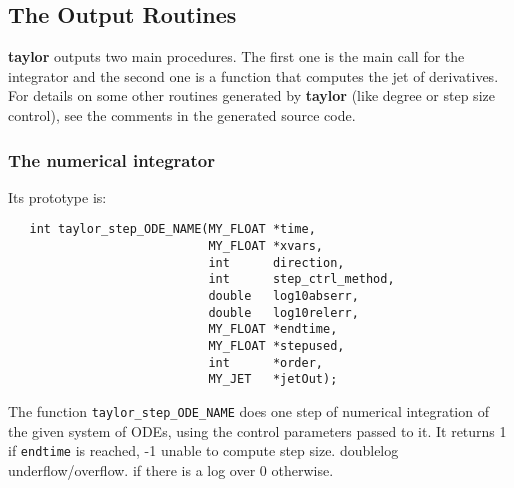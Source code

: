 \documentclass[10pt]{article}
\theoremstyle{remark}
\newcommand{\taylorname}{{\bf taylor}}
\begin{document}
\subsection{The Output Routines}\label{sec:or}
\taylorname{} outputs two main procedures. The first one is the main
call for the integrator and the second one is a function that computes
the jet of derivatives. For details on some other routines generated
by \taylorname{} (like degree or step size control), see the comments
in the generated source code.

\subsubsection*{The numerical integrator}\label{sec:tnu}
Its prototype is:
\begin{verbatim}
   int taylor_step_ODE_NAME(MY_FLOAT *time,
                            MY_FLOAT *xvars,
                            int      direction,
                            int      step_ctrl_method,
                            double   log10abserr,
                            double   log10relerr,
                            MY_FLOAT *endtime,
                            MY_FLOAT *stepused,
                            int      *order,
                            MY_JET   *jetOut);
\end{verbatim}
The function \verb+taylor_step_ODE_NAME+ does one step of numerical
integration of the given system of ODEs, using the control parameters
passed to it. It returns 1 if \verb+endtime+ is reached, -1 unable to compute step size.  doublelog  underflow/overflow. if there is a log over 0 otherwise.

\bigskip
\end{document}
